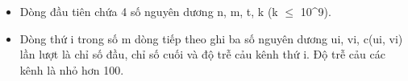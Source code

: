 \begin{itemize}
	\item Dòng đầu tiên chứa 4 số nguyên dương n, m, t, k (k  $\le$  10^9).
	\item Dòng thứ i trong số m dòng tiếp theo ghi ba số nguyên dương ui, vi, c(ui, vi) lần lượt là chỉ số đầu, chỉ số cuối và độ trễ cảu kênh thứ i. Độ trễ cảu các kênh là nhỏ hơn 100.
\end{itemize}